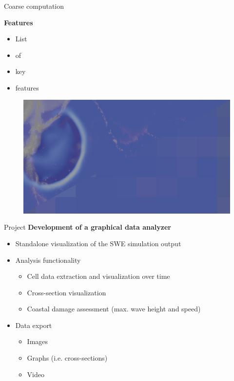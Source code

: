 \documentclass[shortpres,usenames,dvipsnames]{beamer}
\begin{document}
\begin{frame}{Coarse computation}
	\begin{multicols}{2}
		\textbf{Features}
		\begin{itemize}
			\item List
			\item of
			\item key
			\item features
		\end{itemize}
		\columnbreak
		
		\begin{figure}
			\includegraphics[clip,width=0.95\linewidth]{img/tuhoku_mixed.png}
		\end{figure}
	\end{multicols}
	
\end{frame}

\begin{frame}{Project}
	\textbf{Development of a graphical data analyzer}
	\begin{itemize}
		\item Standalone visualization of the SWE simulation output
		\item Analysis functionality
		\begin{itemize}
			\item Cell data extraction and visualization over time
			\item Cross-section visualization
			\item Coastal damage assessment (max. wave height and speed)
		\end{itemize}
		\item Data export
		\begin{itemize}
			\item Images
			\item Graphs (i.e. cross-sections)
			\item Video
		\end{itemize}
	\end{itemize}
\end{frame}
\end{document}
